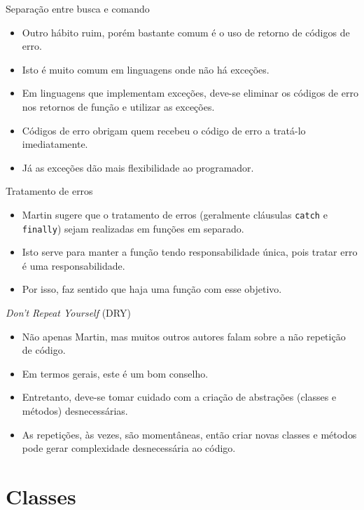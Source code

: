 \documentclass[11pt]{beamer}
\begin{document}
  \begin{frame}{Separação entre busca e comando}
    \begin{itemize}
      \item Outro hábito ruim, porém bastante comum é o uso de retorno de códigos de erro.
      \item Isto é muito comum em linguagens onde não há exceções.
      \item Em linguagens que implementam exceções, deve-se eliminar os códigos de erro nos retornos de função e utilizar as exceções.
      \item Códigos de erro obrigam quem recebeu o código de erro a tratá-lo imediatamente.
      \item Já as exceções dão mais flexibilidade ao programador.
    \end{itemize}
  \end{frame}

  \begin{frame}[fragile]{Tratamento de erros}
    \begin{itemize}
      \item Martin sugere que o tratamento de erros (geralmente cláusulas \verb|catch| e \verb|finally|) sejam realizadas em funções em separado.
      \item Isto serve para manter a função tendo responsabilidade única, pois tratar erro é uma responsabilidade.
      \item Por isso, faz sentido que haja uma função com esse objetivo.
    \end{itemize}
  \end{frame}

  \begin{frame}{\textit{Don't Repeat Yourself} (DRY)}
    \begin{itemize}
      \item Não apenas Martin, mas muitos outros autores falam sobre a não repetição de código.
      \item Em termos gerais, este é um bom conselho.
      \item Entretanto, deve-se tomar cuidado com a criação de abstrações (classes e métodos) desnecessárias.
      \item As repetições, às vezes, são momentâneas, então criar novas classes e métodos pode gerar complexidade desnecessária ao código. 
    \end{itemize}
  \end{frame}

  \section{Classes}
\end{document}
